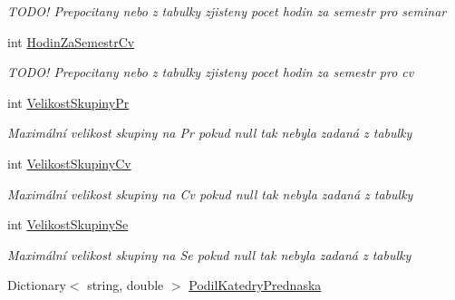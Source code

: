 \begin{DoxyCompactItemize}
\begin{DoxyCompactList}\small\item\em T\+O\+D\+O! Prepocitany nebo z tabulky zjisteny pocet hodin za semestr pro seminar \end{DoxyCompactList}\item 
int \hyperlink{class_analyza_rozvrhu_1_1_s_t_a_g___classes_1_1_predmet_ad21f2e3b9dc5b9ad65d18bebbf81220e}{Hodin\+Za\+Semestr\+Cv}
\begin{DoxyCompactList}\small\item\em T\+O\+D\+O! Prepocitany nebo z tabulky zjisteny pocet hodin za semestr pro cv \end{DoxyCompactList}\item 
int \hyperlink{class_analyza_rozvrhu_1_1_s_t_a_g___classes_1_1_predmet_a02f0915b3e192ca50a5fe7aa0aa3a804}{Velikost\+Skupiny\+Pr}
\begin{DoxyCompactList}\small\item\em Maximální velikost skupiny na Pr pokud null tak nebyla zadaná z tabulky \end{DoxyCompactList}\item 
int \hyperlink{class_analyza_rozvrhu_1_1_s_t_a_g___classes_1_1_predmet_ada4683acd02c3f99f48b1216ffb355c2}{Velikost\+Skupiny\+Cv}
\begin{DoxyCompactList}\small\item\em Maximální velikost skupiny na Cv pokud null tak nebyla zadaná z tabulky \end{DoxyCompactList}\item 
int \hyperlink{class_analyza_rozvrhu_1_1_s_t_a_g___classes_1_1_predmet_a10acbdb4f1e4ab2856651bf0d2f5066d}{Velikost\+Skupiny\+Se}
\begin{DoxyCompactList}\small\item\em Maximální velikost skupiny na Se pokud null tak nebyla zadaná z tabulky \end{DoxyCompactList}\item 
Dictionary$<$ string, double $>$ \hyperlink{class_analyza_rozvrhu_1_1_s_t_a_g___classes_1_1_predmet_aafe9679ab316375dfccb4aa06f81027d}{Podil\+Katedry\+Prednaska}

\end{DoxyCompactItemize}
